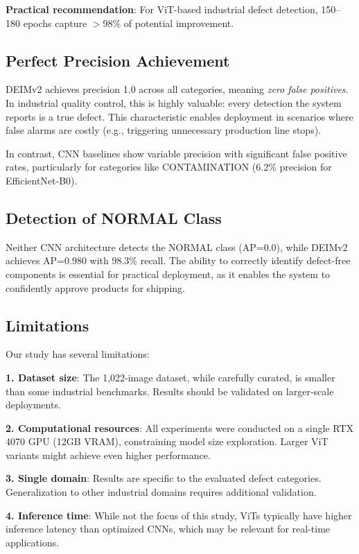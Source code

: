 \documentclass[journal,twoside,web]{ieeecolor}
\begin{document}
\textbf{Practical recommendation}: For ViT-based industrial defect detection, 150--180 epochs capture $>$98\% of potential improvement.

\subsection{Perfect Precision Achievement}

DEIMv2 achieves precision 1.0 across all categories, meaning \textit{zero false positives}. In industrial quality control, this is highly valuable: every detection the system reports is a true defect. This characteristic enables deployment in scenarios where false alarms are costly (e.g., triggering unnecessary production line stops).

In contrast, CNN baselines show variable precision with significant false positive rates, particularly for categories like CONTAMINATION (6.2\% precision for EfficientNet-B0).

\subsection{Detection of NORMAL Class}

Neither CNN architecture detects the NORMAL class (AP=0.0), while DEIMv2 achieves AP=0.980 with 98.3\% recall. The ability to correctly identify defect-free components is essential for practical deployment, as it enables the system to confidently approve products for shipping.

\subsection{Limitations}

Our study has several limitations:

\textbf{1. Dataset size}: The 1,022-image dataset, while carefully curated, is smaller than some industrial benchmarks. Results should be validated on larger-scale deployments.

\textbf{2. Computational resources}: All experiments were conducted on a single RTX 4070 GPU (12GB VRAM), constraining model size exploration. Larger ViT variants might achieve even higher performance.

\textbf{3. Single domain}: Results are specific to the evaluated defect categories. Generalization to other industrial domains requires additional validation.

\textbf{4. Inference time}: While not the focus of this study, ViTs typically have higher inference latency than optimized CNNs, which may be relevant for real-time applications.
\end{document}
